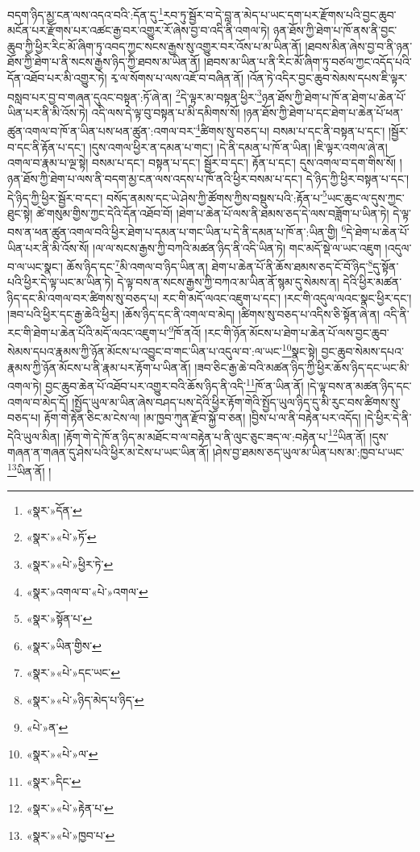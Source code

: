 བདག་ཉིད་མྱ་ངན་ལས་འདའ་བའི་:དོན་དུ་\footnote{«སྣར་»དོན་}རབ་ཏུ་སྦྱོར་བ་དེ་བླ་ན་མེད་པ་ཡང་དག་པར་རྫོགས་པའི་བྱང་ཆུབ་མངོན་པར་རྫོགས་པར་འཚང་རྒྱ་བར་འགྱུར་རོ་ཞེས་བྱ་བ་འདི་ནི་འགལ་ཏེ། ཉན་ཐོས་ཀྱི་ཐེག་པ་ཁོ་ནས་ནི་བྱང་ཆུབ་ཀྱི་ཕྱིར་རིང་མོ་ཞིག་ཏུ་འབད་ཀྱང་སངས་རྒྱས་སུ་འགྱུར་བར་འོས་པ་མ་ཡིན་ནོ། །ཐབས་མིན་ཞེས་བྱ་བ་ནི་ཉན་ཐོས་ཀྱི་ཐེག་པ་ནི་སངས་རྒྱས་ཉིད་ཀྱི་ཐབས་མ་ཡིན་ནོ། །ཐབས་མ་ཡིན་པ་ནི་རིང་མོ་ཞིག་ཏུ་བཙལ་ཀྱང་འདོད་པའི་དོན་འཐོབ་པར་མི་འགྱུར་ཏེ། རྭ་ལ་སོགས་པ་ལས་འཇོ་བ་བཞིན་ནོ། །འོན་ཏེ་འདིར་བྱང་ཆུབ་སེམས་དཔས་ཇི་ལྟར་བསླབ་པར་བྱ་བ་གཞན་དུའང་བསྟན་:ཏོ་ཞེ་ན། \footnote{«སྣར་»«པེ་»ཏོ་}དེ་ལྟར་མ་བསྟན་ཕྱིར་\footnote{«སྣར་»«པེ་»ཕྱིར་ཏེ་}ཉན་ཐོས་ཀྱི་ཐེག་པ་ཁོ་ན་ཐེག་པ་ཆེན་པོ་ཡིན་པར་ནི་མི་འོས་ཏེ། འདི་ལས་དེ་ལྟ་བུ་བསྟན་པ་མི་དམིགས་སོ། །ཉན་ཐོས་ཀྱི་ཐེག་པ་དང་ཐེག་པ་ཆེན་པོ་ཕན་ཚུན་འགལ་བ་ཁོ་ན་ཡིན་པས་ཕན་ཚུན་:འགལ་བར་\footnote{«སྣར་»འགལ་བ་«པེ་»འགལ་}ཚིགས་སུ་བཅད་པ། བསམ་པ་དང་ནི་བསྟན་པ་དང་། །སྦྱོར་བ་དང་ནི་རྟོན་པ་དང་། །དུས་འགལ་ཕྱིར་ན་དམན་པ་གང་། །དེ་ནི་དམན་པ་ཁོ་ན་ཡིན། །ཇི་ལྟར་འགལ་ཞེ་ན། འགལ་བ་རྣམ་པ་ལྔ་སྟེ། བསམ་པ་དང་། བསྟན་པ་དང་། སྦྱོར་བ་དང་། རྟོན་པ་དང་། དུས་འགལ་བ་དག་གིས་སོ། །ཉན་ཐོས་ཀྱི་ཐེག་པ་ལས་ནི་བདག་མྱ་ངན་ལས་འདས་པ་ཁོ་ནའི་ཕྱིར་བསམ་པ་དང་། དེ་ཉིད་ཀྱི་ཕྱིར་བསྟན་པ་དང་། དེ་ཉིད་ཀྱི་ཕྱིར་སྦྱོར་བ་དང་། བསོད་ནམས་དང་ཡེ་ཤེས་ཀྱི་ཚོགས་ཀྱིས་བསྡུས་པའི་:རྟོན་པ་\footnote{«སྣར་»སྟོན་པ་}ཡང་ཆུང་ལ་དུས་ཀྱང་ཐུང་སྟེ། ཚེ་གསུམ་གྱིས་ཀྱང་དེའི་དོན་འཐོབ་བོ། །ཐེག་པ་ཆེན་པོ་ལས་ནི་ཐམས་ཅད་དེ་ལས་བཟློག་པ་ཡིན་ཏེ། དེ་ལྟ་བས་ན་ཕན་ཚུན་འགལ་བའི་ཕྱིར་ཐེག་པ་དམན་པ་གང་ཡིན་པ་དེ་ནི་དམན་པ་ཁོ་ན་:ཡིན་གྱི། \footnote{«སྣར་»ཡིན་གྱིས་}དེ་ཐེག་པ་ཆེན་པོ་ཡིན་པར་ནི་མི་འོས་སོ། །ལ་ལ་སངས་རྒྱས་ཀྱི་བཀའི་མཚན་ཉིད་ནི་འདི་ཡིན་ཏེ། གང་མདོ་སྡེ་ལ་ཡང་འཇུག །འདུལ་བ་ལ་ཡང་སྣང་། ཆོས་ཉིད་དང་\footnote{«སྣར་»«པེ་»དང་ཡང་}མི་འགལ་བ་ཉིད་ཡིན་ན། ཐེག་པ་ཆེན་པོ་ནི་ཆོས་ཐམས་ཅད་ངོ་བོ་ཉིད་\footnote{«སྣར་»«པེ་»ཉིད་མེད་པ་ཉིད་}དུ་སྟོན་པའི་ཕྱིར་དེ་ལྟ་ཡང་མ་ཡིན་ཏེ། དེ་ལྟ་བས་ན་སངས་རྒྱས་ཀྱི་བཀའ་མ་ཡིན་ནོ་སྙམ་དུ་སེམས་ན། དེའི་ཕྱིར་མཚན་ཉིད་དང་མི་འགལ་བར་ཚིགས་སུ་བཅད་པ། རང་གི་མདོ་ལའང་འཇུག་པ་དང་། །རང་གི་འདུལ་ལའང་སྣང་ཕྱིར་དང་། །ཟབ་པའི་ཕྱིར་དང་རྒྱ་ཆེའི་ཕྱིར། །ཆོས་ཉིད་དང་ནི་འགལ་བ་མེད། །ཚིགས་སུ་བཅད་པ་འདིས་ཅི་སྟོན་ཞེ་ན། འདི་ནི་རང་གི་ཐེག་པ་ཆེན་པོའི་མདོ་ལའང་འཇུག་པ་\footnote{«པེ་»ན་}ཁོ་ནའོ། །རང་གི་ཉོན་མོངས་པ་ཐེག་པ་ཆེན་པོ་ལས་བྱང་ཆུབ་སེམས་དཔའ་རྣམས་ཀྱི་ཉོན་མོངས་པ་འབྱུང་བ་གང་ཡིན་པ་འདུལ་བ་:ལ་ཡང་\footnote{«སྣར་»«པེ་»ལ་}སྣང་སྟེ། བྱང་ཆུབ་སེམས་དཔའ་རྣམས་ཀྱི་ཉོན་མོངས་པ་ནི་རྣམ་པར་རྟོག་པ་ཡིན་ནོ། །ཟབ་ཅིང་རྒྱ་ཆེ་བའི་མཚན་ཉིད་ཀྱི་ཕྱིར་ཆོས་ཉིད་དང་ཡང་མི་འགལ་ཏེ། བྱང་ཆུབ་ཆེན་པོ་འཐོབ་པར་འགྱུར་བའི་ཆོས་ཉིད་ནི་འདི་\footnote{«སྣར་»དིང་}ཁོ་ན་ཡིན་ནོ། །དེ་ལྟ་བས་ན་མཚན་ཉིད་དང་འགལ་བ་མེད་དོ། །སྤྱོད་ཡུལ་མ་ཡིན་ཞེས་བཤད་པས་དེའི་ཕྱིར་རྟོག་གེའི་སྤྱོད་ཡུལ་ཉིད་དུ་མི་རུང་བས་ཚིགས་སུ་བཅད་པ། རྟོག་གེ་རྟེན་ཅིང་མ་ངེས་ལ། །མ་ཁྱབ་ཀུན་རྫོབ་སྐྱོ་བ་ཅན། །བྱིས་པ་ལ་ནི་བརྟེན་པར་འདོད། །དེ་ཕྱིར་དེ་ནི་དེའི་ཡུལ་མིན། །རྟོག་གེ་དེ་ཁོ་ན་ཉིད་མ་མཐོང་བ་ལ་བརྟེན་པ་ནི་ལུང་ཅུང་ཟད་ལ་:བརྟེན་པ་\footnote{«སྣར་»«པེ་»རྟེན་པ་}ཡིན་ནོ། །དུས་གཞན་ན་གཞན་དུ་ཤེས་པའི་ཕྱིར་མ་ངེས་པ་ཡང་ཡིན་ནོ། །ཤེས་བྱ་ཐམས་ཅད་ཡུལ་མ་ཡིན་པས་མ་:ཁྱབ་པ་ཡང་\footnote{«སྣར་»«པེ་»ཁྱབ་པ་}ཡིན་ནོ། །
